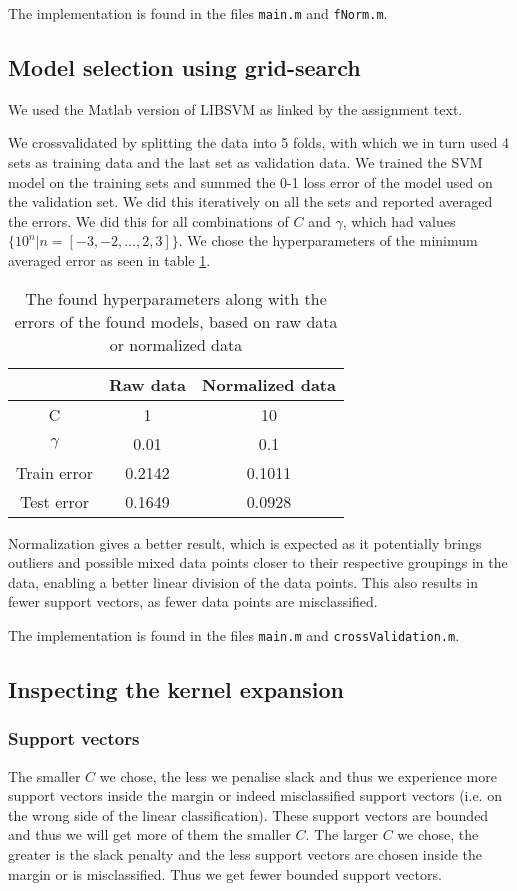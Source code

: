\documentclass[a4paper, 11pt]{article}
\begin{document}
The implementation is found in the files \texttt{main.m} and \texttt{fNorm.m}.

\subsection{Model selection using grid-search}
We used the Matlab version of LIBSVM as linked by the assignment text.

We crossvalidated by splitting the data into 5 folds, with which we in turn used 4 sets as training data and the last set as validation data. We trained the SVM model on the training sets and summed the 0-1 loss error of the model used on the validation set. We did this iteratively on all the sets and reported averaged the errors. We did this for all combinations of $C$ and $\gamma$, which had values $\{10^n | n=[-3, -2,\ldots,2,3] \}$. We chose the hyperparameters of the minimum averaged error as seen in table \ref{tab:gridsearch}.

\begin{table}[H]
\centering
\begin{tabular}{c|c|c}
                & Raw data & Normalized data \\ \hline
    C           & 1        & 10 \\
    $\gamma$    & 0.01     & 0.1 \\
    Train error & 0.2142   & 0.1011 \\
    Test error  & 0.1649   & 0.0928
\end{tabular}
\caption{The found hyperparameters along with the errors of the found models, based on raw data or normalized data}
\label{tab:gridsearch}
\end{table}

Normalization gives a better result, which is expected as it potentially brings outliers and possible mixed data points closer to their respective groupings in the data, enabling a better linear division of the data points. This also results in fewer support vectors, as fewer data points are misclassified.

The implementation is found in the files \texttt{main.m} and \texttt{crossValidation.m}.

\subsection{Inspecting the kernel expansion}
\subsubsection{Support vectors}
The smaller $C$ we chose, the less we penalise slack and thus we experience more support vectors inside the margin or indeed misclassified support vectors (i.e. on the wrong side of the linear classification). These support vectors are bounded and thus we will get more of them the smaller $C$.
The larger $C$ we chose, the greater is the slack penalty and the less support vectors are chosen inside the margin or is misclassified. Thus we get fewer bounded support vectors.
\end{document}
